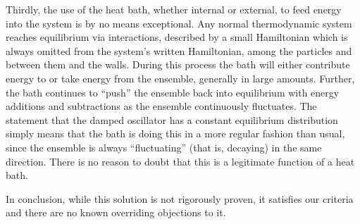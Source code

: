 Thirdly, the use of the heat bath, whether internal or external, to feed
energy into the system is by no means exceptional.  Any normal thermodynamic
system reaches equilibrium via interactions, described by a small Hamiltonian
which is always omitted from the system's written Hamiltonian, among the
particles and between them and the walls.  During this process the bath will
either contribute energy to or take energy from the ensemble, generally in
large amounts.  Further, the bath continues to ``push'' the ensemble back
into equilibrium with energy additions and subtractions as the ensemble
continuously fluctuates.  The statement that the damped oscillator has a 
constant equilibrium distribution simply means that the bath is doing this
in a more regular fashion than usual, since the ensemble is always
``fluctuating'' (that is, decaying) in the same direction.  There is no reason
to doubt that this is a legitimate function of a heat bath.

In conclusion, while this solution is not rigorously proven, it satisfies
our criteria and there are no known overriding objections to it.

\newpage


  
